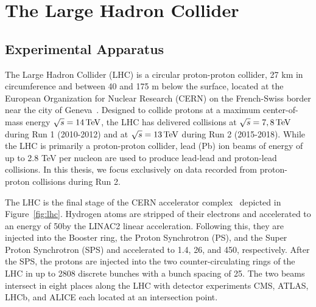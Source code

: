 \chapter{The Large Hadron Collider}

\section{Experimental Apparatus}

The Large Hadron Collider (LHC) is a circular proton-proton collider, 27 km in circumference and between 40 and 175 m below the surface, located at the European Organization for Nuclear Research (CERN) on the French-Swiss border near the city of Geneva~\cite{Evans2008}.
Designed to collide protons at a maximum center-of-mass energy $\sqrt{s} = 14\,\text{Te\hspace{-.08em}V}$, the LHC has delivered collisions at $\sqrt{s} = 7, 8 \,\text{Te\hspace{-.08em}V}$ during Run 1 (2010-2012) and at $\sqrt{s} = 13\,\text{Te\hspace{-.08em}V}$ during Run 2 (2015-2018).
While the LHC is primarily a proton-proton collider, lead (Pb) ion beams of energy of up to 2.8 TeV per nucleon are used to produce lead-lead and proton-lead collisions.
In this thesis, we focus exclusively on data recorded from proton-proton collisions during Run 2.

The LHC is the final stage of the CERN accelerator complex~\cite{Benedikt2004} depicted in Figure~\ref{fig:lhc}.
Hydrogen atoms are stripped of their electrons and accelerated to an energy of 50\MeV by the LINAC2 linear acceleration.
Following this, they are injected into the Booster ring, the Proton Synchrotron (PS), and the Super Proton Synchrotron (SPS) and accelerated to 1.4, 26, and 450\GeV, respectively.
After the SPS, the protons are injected into the two counter-circulating rings of the LHC in up to 2808 discrete bunches with a bunch spacing of 25\ns.
The two beams intersect in eight places along the LHC with detector experiments CMS, ATLAS, LHCb, and ALICE each located at an intersection point.

